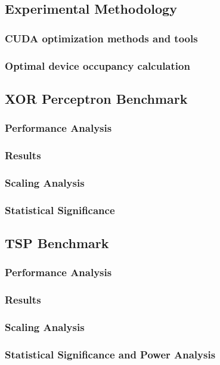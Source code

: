 \documentclass[a4paper,14pt]{extarticle}
\begin{document}
\subsection{Experimental Methodology}
\subsubsection{CUDA optimization methods and tools}
\subsubsection{Optimal device occupancy calculation}

\subsection{XOR Perceptron Benchmark}
\subsubsection{Performance Analysis}
\subsubsection{Results}
\subsubsection{Scaling Analysis}
\subsubsection{Statistical Significance}

\subsection{TSP Benchmark}
\subsubsection{Performance Analysis}
\subsubsection{Results}
\subsubsection{Scaling Analysis}
\subsubsection{Statistical Significance and Power Analysis}
\end{document}
